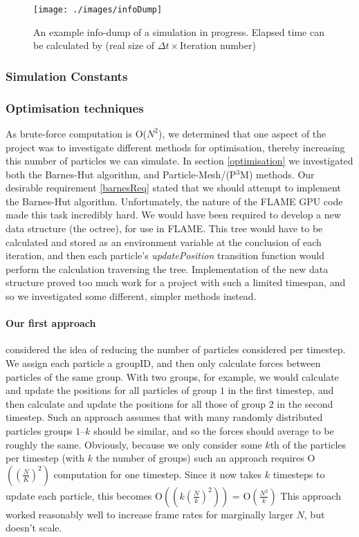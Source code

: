 \documentclass[11pt,a4paper]{article}
\begin{document}
\begin{figure}[h!]
\texttt{[image: ./images/infoDump]}
\caption[Simulation information dump]{An example info-dump of a simulation in progress. Elapsed time can be calculated by (real size of $\Delta t \times$Iteration number)}
\end{figure}

\subsubsection{Simulation Constants}

\subsubsection{Optimisation techniques}
\label{optimisationImplementation}
As brute-force computation is O($N^2$), we determined that one aspect of the project was to investigate different methods for optimisation, thereby increasing this number of particles we can simulate. In section \ref{optimisation} we investigated both the Barnes-Hut algorithm, and Particle-Mesh/(P$^3$M) methods. Our desirable requirement \ref{barnesReq} stated that we should attempt to implement the Barnes-Hut algorithm. Unfortunately, the nature of the FLAME GPU code made this task incredibly hard. We would have been required to develop a new data structure (the octree), for use in FLAME. This tree would have to be calculated and stored as an environment variable at the conclusion of each iteration, and then each particle's \emph{updatePosition} transition function would perform the calculation traversing the tree. Implementation of the new data structure proved too much work for a project with such a limited timespan, and so we investigated some different, simpler methods instead.

\paragraph{Our first approach} considered the idea of reducing the number of particles considered per timestep. We assign each particle a groupID, and then only calculate forces between particles of the same group. With two groups, for example, we would calculate and update the positions for all particles of group $1$ in the first timestep, and then calculate and update the positions for all those of group $2$ in the second timestep. Such an approach assumes that with many randomly distributed particles groups $1$--$k$ should be similar, and so the forces should average to be roughly the same. Obviously, because we only consider some $k$th of the particles per timestep (with $k$ the number of groups) such an approach requires O$((\frac{N}{K})^2)$ computation for one timestep. Since it now takes $k$ timesteps to update each particle, this becomes O$((k(\frac{N}{k})^2))$ = O$(\frac{N^2}{k})$ This approach worked reasonably well to increase frame rates for marginally larger $N$, but doesn't scale.
\end{document}
